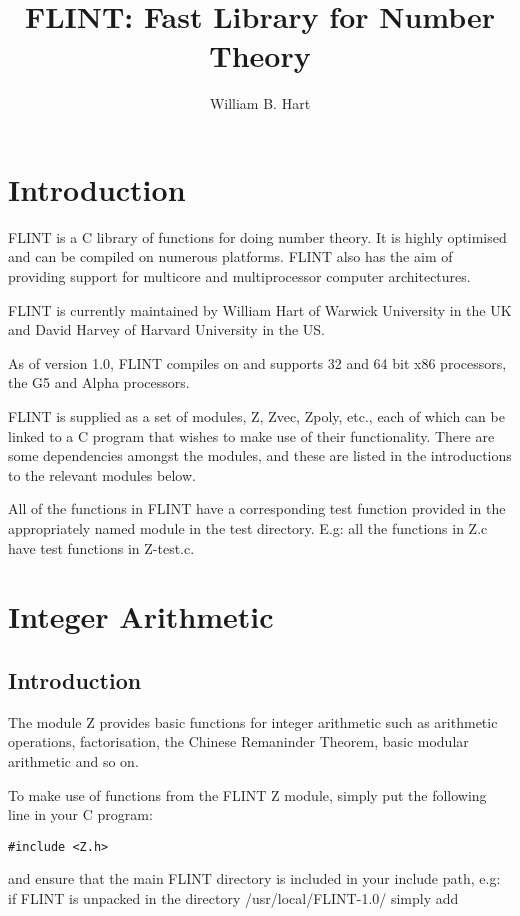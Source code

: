 \documentclass[a4paper,10pt]{article}
\title{FLINT: Fast Library for Number Theory}
\author{William B. Hart}
\begin{document}
\maketitle
\lstset{language=c}
\lstset{escapeinside=\%\%}

\section{Introduction}

FLINT is a C library of functions for doing number theory. It is highly optimised and can be compiled on numerous platforms. FLINT also has the aim of providing support for multicore and multiprocessor computer architectures.

FLINT is currently maintained by William Hart of Warwick University in the UK and David Harvey of Harvard University in the US.

As of version 1.0, FLINT compiles on and supports 32 and 64 bit x86 processors, the G5 and Alpha processors.

FLINT is supplied as a set of modules, Z, Zvec, Zpoly, etc., each of which can be linked to a C program that wishes to make use of their functionality. There are some dependencies amongst the modules, and these are listed in the introductions to the relevant modules below.

All of the functions in FLINT have a corresponding test function provided in the appropriately named module in the test directory. E.g: all the functions in Z.c have test functions in Z-test.c.

\newpage
\section{Integer Arithmetic}
\subsection{Introduction}
The module Z provides basic functions for integer arithmetic such as arithmetic operations, factorisation, the Chinese Remaninder Theorem, basic modular arithmetic and so on. 

To make use of functions from the FLINT Z module, simply put the following line in your C program:

\begin{verbatim}#include <Z.h>\end{verbatim}

and ensure that the main FLINT directory is included in your include path, e.g: if FLINT is unpacked in the directory /usr/local/FLINT-1.0/ simply add
\end{document}
